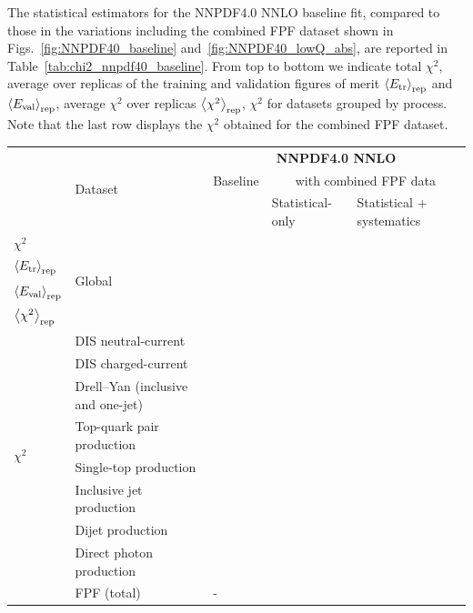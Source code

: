 The statistical estimators for the NNPDF4.0 NNLO
baseline fit, compared to those in the variations including
the combined FPF dataset shown in Figs.~\ref{fig:NNPDF40_baseline}
and~\ref{fig:NNPDF40_lowQ_abs}, are reported in Table~\ref{tab:chi2_nnpdf40_baseline}.
%
From top to bottom we indicate total $\chi^2$, average
over replicas of the training and validation figures of merit
$\left\langle E_{\rm tr}\right\rangle_{\rm rep}$ and $\left\langle E_{\rm val}\right\rangle_{\rm rep}$,
average $\chi^2$ over replicas $\left\langle \chi^2\right\rangle_{\rm rep}$,
$\chi^2$ for datasets grouped by process.
%
Note that the last row displays the $\chi^2$ obtained for the combined FPF dataset.

\begin{table}[!t]
  \centering
  \footnotesize
  \renewcommand{\arraystretch}{1.30}
  \begin{tabularx}{\textwidth}{X|l|l|l|l}
  \toprule
  & \multirow{3}{*}{Dataset}
  & \multicolumn{3}{c}{\bf NNPDF4.0 NNLO} \\
  &
  & Baseline
  & \multicolumn{2}{c}{with combined FPF data}  \\
  &
  &
  & Statistical-only  & Statistical + systematics  \\
  \midrule
  $\chi^2$ &  \multirow{4}{*}{Global}      &  &    &  \\
  $\left\langle E_{\rm tr}\right\rangle_{\rm rep}$
  & &    &     &   \\
  $\left\langle E_{\rm val}\right\rangle_{\rm rep}$
  & &     &     & \\
  $\left\langle \chi^2\right\rangle_{\rm rep}$
  & &      &        &   \\
  \midrule
  \multirow{8}{*}{$\chi^2$}
  & DIS neutral-current                     &      &       &      \\
  & DIS charged-current                     &     &       &      \\
  & Drell--Yan (inclusive and one-jet) &     &       &      \\
  & Top-quark pair production               &     &       &      \\
  & Single-top production                   &     &       &      \\
  & Inclusive jet production                &     &       &      \\
  & Dijet production                        &     &       &      \\
  & Direct photon production                 &    &       &      \\
  & FPF (total)                 &  -  &       &      \\

\end{tabularx}
\end{table}
